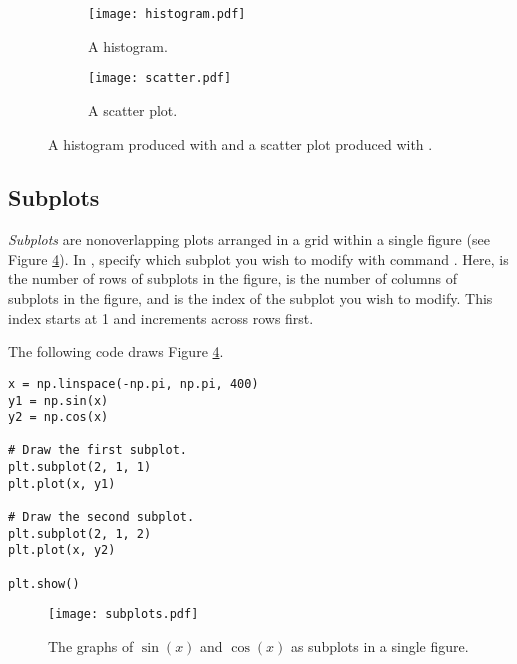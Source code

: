 \begin{figure}
\centering
\begin{subfigure}[t]{.49\textwidth}
\centering
\texttt{[image: histogram.pdf]}
\caption{A histogram.}
\label{fig:histogram}
\end{subfigure}
\begin{subfigure}[t]{.49\textwidth}
\centering
\texttt{[image: scatter.pdf]}
\caption{A scatter plot.}
\label{fig:scatter}
\end{subfigure}
\caption{A histogram produced with and a scatter plot produced with .}
\label{fig:otherplots}
\end{figure}


\subsection*{Subplots}
\emph{Subplots} are nonoverlapping plots arranged in a grid within a single figure (see Figure \ref{fig:subplots}).
In , specify which subplot you wish to modify with command .
Here,  is the number of rows of subplots in the figure,  is the number of columns of subplots in the figure, and  is the index of the subplot you wish to modify.
This index starts at 1 and increments across rows first.

The following code draws Figure \ref{fig:subplots}.
\begin{lstlisting}
x = np.linspace(-np.pi, np.pi, 400)
y1 = np.sin(x)
y2 = np.cos(x)

# Draw the first subplot.
plt.subplot(2, 1, 1)
plt.plot(x, y1)

# Draw the second subplot.
plt.subplot(2, 1, 2)
plt.plot(x, y2)

plt.show()
\end{lstlisting}

\begin{figure}
\texttt{[image: subplots.pdf]}
\caption{The graphs of $\sin(x)$ and $\cos(x)$ as subplots in a single figure.}
\label{fig:subplots}
\end{figure}

